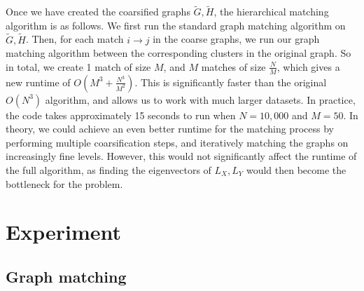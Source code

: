 \documentclass{article}[11pt]
\begin{document}
Once we have created the coarsified graphs $\tilde{G},\tilde{H}$, the
hierarchical matching algorithm is as follows. We first run the standard graph
matching algorithm on $\tilde{G},\tilde{H}$. Then, for each match $i \to j$ in
the coarse graphs, we run our graph matching algorithm between the corresponding
clusters in the original graph. So in total, we create 1 match of size $M$, and
$M$ matches of size $\frac{N}{M}$, which gives a new runtime of
$O\left(M^3 + \frac{N^3}{M^2}\right)$. This is significantly faster than the
original $O(N^3)$ algorithm, and allows us to work with much larger datasets. In
practice, the code takes approximately 15 seconds to run when $N = 10,000$ and
$M=50$. In theory, we could achieve an even better runtime for the matching
process by performing multiple coarsification steps, and iteratively matching
the graphs on increasingly fine levels. However, this would not significantly
affect the runtime of the full algorithm, as finding the eigenvectors of
$L_X,L_Y$ would then become the bottleneck for the problem.


\section{Experiment}
\label{sec:experiment}
\subsection{Graph matching}
%
%
\end{document}
